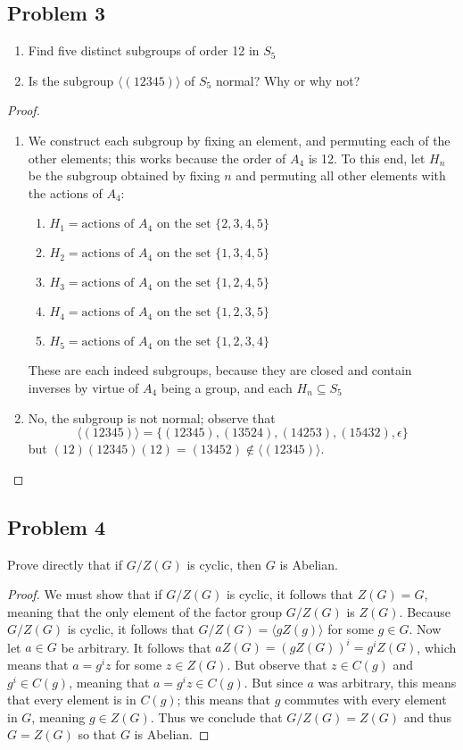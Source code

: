 \documentclass{article}
\begin{document}
\subsection*{Problem 3}
\begin{enumerate}
	\item Find five distinct subgroups of order 12 in $S_5$
	\item Is the subgroup $\langle (12345) \rangle$ of $S_5$ normal? Why or why not?
\end{enumerate}
\begin{proof}
\qquad
\begin{enumerate}
	\item 
	We construct each subgroup by fixing an element, and permuting each of 
	the other elements; this works because the order of $A_4$ is 12. To this 
	end, let $H_n$ be the subgroup obtained by fixing $n$ and permuting all 
	other elements with the actions of $A_4$:
	\begin{enumerate}
		\item $H_1 = \text{actions of $A_4$ on the set } \{2, 3, 4, 5\}$
		\item $H_2 = \text{actions of $A_4$ on the set } \{1, 3, 4, 5\}$
		\item $H_3 = \text{actions of $A_4$ on the set } \{1, 2, 4, 5\}$
		\item $H_4 = \text{actions of $A_4$ on the set } \{1, 2, 3, 5\}$
		\item $H_5 = \text{actions of $A_4$ on the set } \{1, 2, 3, 4\}$
	\end{enumerate}	
	These are each indeed subgroups, because they are closed and 
	contain inverses by virtue of $A_4$  being a group, and each $H_n \subseteq S_5$
	\item 
	No, the subgroup is not normal; observe that 
	\[ \langle (12345) \rangle = \{(12345), (13524), (14253), (15432), \epsilon \}\]
	but $(12)(12345)(12) = (13452) \notin \langle (12345) \rangle$.
\end{enumerate}
\end{proof}

\subsection*{Problem 4}
Prove directly that if $G/Z(G)$ is cyclic, then $G$ is Abelian.
\begin{proof}
	We must show that if $G/Z(G)$ is cyclic, it follows that $Z(G) = G$, meaning that 
	the only element of the factor group $G/Z(G)$ is $Z(G)$. Because $G/Z(G)$ is 
	cyclic, it follows that $G/Z(G) = \langle gZ(g) \rangle$ for some $g \in G$. Now 
	let $a \in G$ be arbitrary. It follows that $aZ(G) = (gZ(G))^i = g^iZ(G)$, which 
	means that $a = g^iz$ for some $z \in Z(G)$. But observe that $z \in C(g)$ and 
	$g^i \in C(g)$, meaning that $a = g^iz \in C(g)$. But since $a$ was arbitrary, 
	this means that every element is in $C(g)$; this means that $g$ commutes with 
	every element in $G$, meaning $g \in Z(G)$. Thus we conclude that $G/Z(G) = Z(G)$
	and thus $G = Z(G)$ so that $G$ is Abelian. 
\end{proof}
\end{document}
